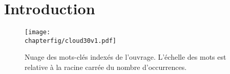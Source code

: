 \chapter{Introduction}\label{chap:in}

\renewcommand\chapterpath{Main/Intro}
\renewcommand\chapterfig{Main/Intro/Figures}

\vfill
\begin{figure*}[!ht]
    \centering
    \texttt{[image: \\chapterfig/cloud30v1.pdf]}
    \caption{Nuage des mots-clés indexés de l'ouvrage. L'échelle des mots est relative à la racine carrée du nombre d'occurrences.}
\end{figure*}
\vfill
\pagebreak


